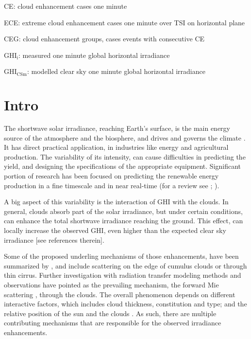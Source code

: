 \documentclass[preprint, 5p,
authoryear]{elsarticle} %
\begin{document}
CE: cloud enhancement cases one minute

ECE: extreme cloud enhancement cases one minute over TSI on horizontal
plane

CEG: cloud enhancement groups, cases events with consecutive CE

\(\text{GHI}_\text{i}\): measured one minute global horizontal
irradiance

\(\text{GHI}_\text{CSm}\): modelled clear sky one minute global
horizontal irradiance

\hypertarget{intro}{%
\section{Intro}\label{intro}}

The shortwave solar irradiance, reaching Earth's surface, is the main
energy source of the atmosphere and the biosphere, and drives and
governs the climate \citep{Gray2010}. It has direct practical
application, in industries like energy and agricultural production. The
variability of its intensity, can cause difficulties in predicting the
yield, and designing the specifications of the appropriate equipment.
Significant portion of research has been focused on predicting the
renewable energy production in a fine timescale and in near real-time
(for a review see \citet{Inman2013}; \citet{Graabak2016}).

A big aspect of this variability is the interaction of GHI with the
clouds. In general, clouds absorb part of the solar irradiance, but
under certain conditions, can enhance the total shortwave irradiance
reaching the ground. This effect, can locally increase the observed GHI,
even higher than the expected clear sky irradiance {[}see references
therein{]}.

Some of the proposed underling mechanisms of those enhancements, have
been summarized by \citet{Gueymard2017}, and include scattering on the
edge of cumulus clouds or through thin cirrus. Further investigation
with radiation transfer modeling methods and observations have pointed
as the prevailing mechanism, the forward Mie scattering
\citep{Pecenak2016, Thuillier2013, Yordanov2013, Yordanov2015}, through
the clouds. The overall phenomenon depends on different interactive
factors, which includes cloud thickness, constitution and type; and the
relative position of the sun and the clouds
\citep{Gueymard2017, Veerman2022}. As such, there are multiple
contributing mechanisms that are responsible for the observed irradiance
enhancements.
\end{document}
